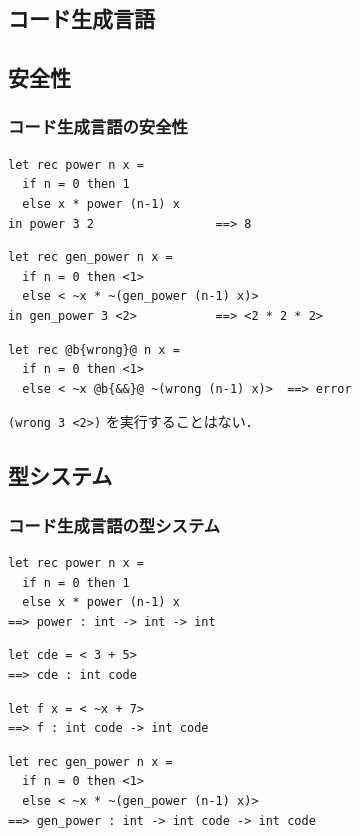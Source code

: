 \documentclass[dvipdfmx,cjk,xcolor=dvipsnames,envcountsect,notheorems,12pt,handout]{beamer} \usepackage{pgfpages} \pgfpagesuselayout{4 on 1}[a4paper,landscape,border shrink=5mm]
\theoremstyle{definition}
\begin{document}
\begin{appendix}


  \section{コード生成言語}
  \subsection{安全性}

\begin{frame}[fragile]
  \frametitle{コード生成言語の安全性}
\begin{lstlisting}
let rec power n x =
  if n = 0 then 1
  else x * power (n-1) x
in power 3 2                 ==> 8
\end{lstlisting}
\begin{lstlisting}
let rec gen_power n x =
  if n = 0 then <1>
  else < ~x * ~(gen_power (n-1) x)>
in gen_power 3 <2>           ==> <2 * 2 * 2>
\end{lstlisting}
\begin{lstlisting}
let rec @b{wrong}@ n x =
  if n = 0 then <1>
  else < ~x @b{&&}@ ~(wrong (n-1) x)>  ==> error
\end{lstlisting}
  \texttt{(wrong 3 <2>)} を実行することはない．
\end{frame}

\subsection{型システム}

\begin{frame}[fragile]
  \frametitle{コード生成言語の型システム}
\begin{lstlisting}
let rec power n x =
  if n = 0 then 1
  else x * power (n-1) x
==> power : int -> int -> int
\end{lstlisting}
\begin{lstlisting}
let cde = < 3 + 5>
==> cde : int code
\end{lstlisting}
\begin{lstlisting}
let f x = < ~x + 7>
==> f : int code -> int code
\end{lstlisting}
\begin{lstlisting}
let rec gen_power n x =
  if n = 0 then <1>
  else < ~x * ~(gen_power (n-1) x)>
==> gen_power : int -> int code -> int code
\end{lstlisting}


\end{frame}
\end{appendix}
\end{document}
